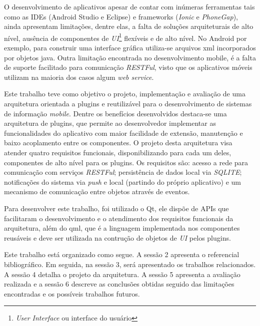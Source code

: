 O desenvolvimento de aplicativos apesar de contar com inúmeras ferramentas tais como as IDEs (Android Studio e Eclipse) e frameworks (\textit{Ionic} e \textit{PhoneGap}), ainda apresentam limitações, dentre elas, a falta de soluções arquiteturais de alto nível, ausência de componentes de \textit{UI}\footnote{\textit{User Interface} ou interface do usuário} flexíveis e de alto nível. No Android por exemplo, para construir uma interface gráfica utiliza-se arquivos xml incorporados por objetos java. Outra limitação encontrada no desenvolvimento mobile, é a falta de suporte facilitado para comunicação \textit{RESTFul}, visto que os aplicativos móveis utilizam na maioria dos casos algum \textit{web service}.


Este trabalho teve como objetivo o projeto, implementação e avaliação de uma arquitetura orientada a plugins e reutilizável para o desenvolvimento de sistemas de informação \textit{mobile}. Dentre os benefícios desenvolvidos destaca-se uma arquitetura de plugins, que permite ao desenvolvedor implementar as funcionalidades do aplicativo com maior facilidade de extensão, manutenção e baixo acoplamento entre os componentes. O projeto desta arquitetura visa atender quatro requisitos funcionais, disponibilizando para cada um deles, componentes de alto nível para os plugins. Os requisitos são: acesso a rede para comunicação com serviços \textit{RESTFul}; persistência de dados local via \textit{SQLITE}; notificações do sistema via \textit{push} e local (partindo do próprio aplicativo) e um mecanismo de comunicação entre objetos através de eventos.


Para desenvolver este trabalho, foi utilizado o Qt, ele dispõe de APIs que facilitaram o desenvolvimento e o atendimento dos requisitos funcionais da arquitetura, além do qml, que é a linguagem implementada nos componentes reusáveis e deve ser utilizada na contrução de objetos de \textit{UI} pelos plugins.


Este trabalho está organizado como segue. A sessão 2 apresenta o referencial bibliográfico. Em seguida, na sessão 3, será apresentado os trabalhos relacionados. A sessão 4 detalha o projeto da arquitetura. A sessão 5 apresenta a avaliação realizada e a sessão 6 descreve as conclusões obtidas seguido das limitações encontradas e os possíveis trabalhos futuros.